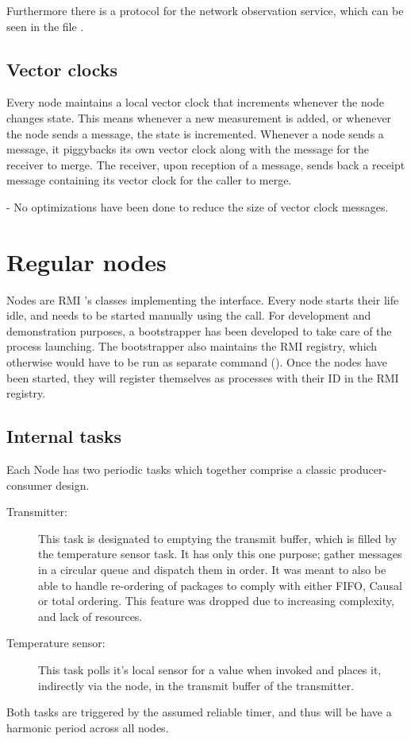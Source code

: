 \documentclass[10pt,a4paper]{article}
\begin{document}
Furthermore there is a protocol for the network observation service, which can be seen in the file .


\subsection{Vector clocks}
Every node maintains a local vector clock that increments whenever the node changes state. This means whenever a new measurement is added, or whenever the node sends a message, the state is incremented. Whenever a node sends a message, it piggybacks its own vector clock along with the message for the receiver to merge. The receiver, upon reception of a message, sends back a receipt message containing its vector clock for the caller to merge.

- No optimizations have been done to reduce the size of vector clock messages.

\section{Regular nodes}
Nodes are RMI 's classes implementing the  interface.
Every node starts their life idle, and needs to be started manually using the  call. For development and demonstration purposes, a bootstrapper has been developed to take care of the process launching. The bootstrapper also maintains the RMI registry, which otherwise would have to be run as separate command ().
Once the nodes have been started, they will register themselves as processes with their ID in the RMI registry.

\subsection{Internal tasks}
\label{sec:internal_tasks}
Each Node has two periodic tasks which together comprise a classic producer-consumer design.
\begin{description}
  \item[Transmitter:] This task is designated to emptying the transmit buffer, which is filled by the temperature sensor task. It has only this one purpose; gather messages in a circular queue and dispatch them in order. It was meant to also be able to handle re-ordering of packages to comply with either FIFO, Causal or total ordering. This feature was dropped due to increasing complexity, and lack of resources.
  \item[Temperature sensor:] This task polls it's local sensor for a value when invoked and places it, indirectly via the node, in the transmit buffer of the transmitter.
\end{description}
Both tasks are triggered by the assumed reliable timer, and thus will be have a harmonic period across all nodes.
\end{document}

